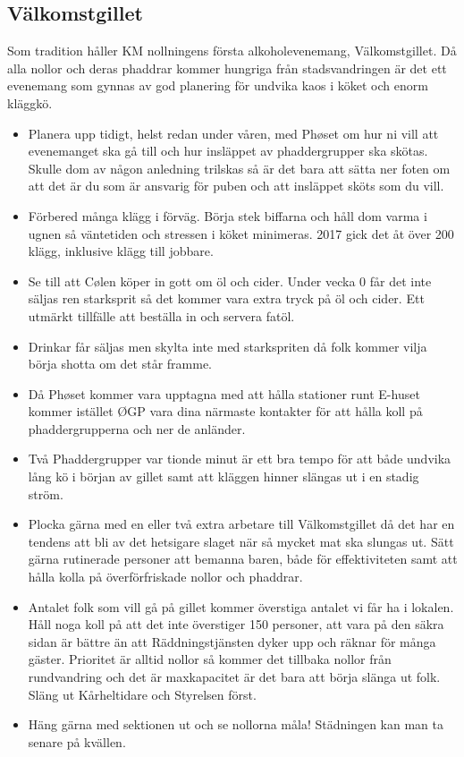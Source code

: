 \documentclass[10pt]{article}
\begin{document}
\subsection{Välkomstgillet}
Som tradition håller KM nollningens första alkoholevenemang, Välkomstgillet. Då alla nollor och deras phaddrar kommer hungriga från stadsvandringen är det ett evenemang som gynnas av god planering för undvika kaos i köket och enorm kläggkö.
\begin{itemize}
	\item Planera upp tidigt, helst redan under våren, med Phøset om hur ni vill att evenemanget ska gå till och hur insläppet av phaddergrupper ska skötas. Skulle dom av någon anledning trilskas så är det bara att sätta ner foten om att det är du som är ansvarig för puben och att insläppet sköts som du vill.
    \item Förbered många klägg i förväg. Börja stek biffarna och håll dom varma i ugnen så väntetiden och stressen i köket minimeras. 2017 gick det åt över 200 klägg, inklusive klägg till jobbare.
    \item Se till att Cølen köper in gott om öl och cider. Under vecka 0 får det inte säljas ren starksprit så det kommer vara extra tryck på öl och cider. Ett utmärkt tillfälle att beställa in och servera fatöl.
    \item Drinkar får säljas men skylta inte med starkspriten då folk kommer vilja börja shotta om det står framme.
    \item Då Phøset kommer vara upptagna med att hålla stationer runt E-huset kommer istället ØGP vara dina närmaste kontakter för att hålla koll på phaddergrupperna och ner de anländer.
    \item Två Phaddergrupper var tionde minut är ett bra tempo för att både undvika lång kö i början av gillet samt att kläggen hinner slängas ut i en stadig ström.
    \item Plocka gärna med en eller två extra arbetare till Välkomstgillet då det har en tendens att bli av det hetsigare slaget när så mycket mat ska slungas ut. Sätt gärna rutinerade personer att bemanna baren, både för effektiviteten samt att hålla kolla på överförfriskade nollor och phaddrar.
    \item Antalet folk som vill gå på gillet kommer överstiga antalet vi får ha i lokalen. Håll noga koll på att det inte överstiger 150 personer, att vara på den säkra sidan är bättre än att Räddningstjänsten dyker upp och räknar för många gäster. Prioritet är alltid nollor så kommer det tillbaka nollor från rundvandring och det är maxkapacitet är det bara att börja slänga ut folk. Släng ut Kårheltidare och Styrelsen först.
    \item Häng gärna med sektionen ut och se nollorna måla! Städningen kan man ta senare på kvällen.

\end{itemize}
\end{document}

